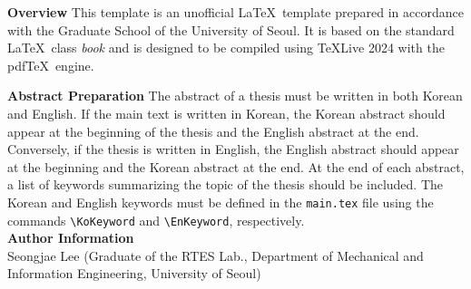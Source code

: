 
\indent
\textbf{Overview}
This template is an unofficial \LaTeX~template prepared in accordance with the Graduate School of the University of Seoul. It is based on the standard \LaTeX~class \textit{book} and is designed to be compiled using TeXLive 2024 with the pdf\TeX~engine.

\textbf{Abstract Preparation}
The abstract of a thesis must be written in both Korean and English. If the main text is written in Korean, the Korean abstract should appear at the beginning of the thesis and the English abstract at the end. Conversely, if the thesis is written in English, the English abstract should appear at the beginning and the Korean abstract at the end. At the end of each abstract, a list of keywords summarizing the topic of the thesis should be included. The Korean and English keywords must be defined in the \texttt{main.tex} file using the commands \texttt{\textbackslash KoKeyword} and \texttt{\textbackslash EnKeyword}, respectively. \\

\noindent
\textbf{Author Information} \\
Seongjae Lee (Graduate of the RTES Lab., Department of Mechanical and Information Engineering, University of Seoul) \\